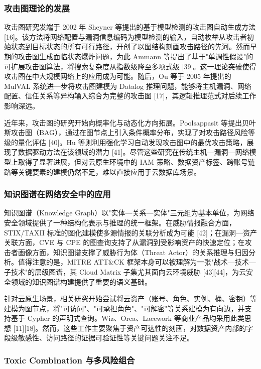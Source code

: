 \documentclass[a4paper,12pt]{ctexart}
\begin{document}
\subsubsection{攻击图理论的发展}

攻击图研究发端于 2002 年 Sheyner 等提出的基于模型检测的攻击图自动生成方法 [16]。该方法将网络配置与漏洞信息编码为模型检测的输入，自动枚举从攻击者初始状态到目标状态的所有可行路径，开创了以图结构刻画攻击路径的先河。然而早期的攻击图生成面临状态爆炸问题，为此 Ammann 等提出了基于"单调性假设"的可扩展攻击图算法，将搜索复杂度从指数级降至多项式级 [39]。这一理论突破使得攻击图在中大规模网络上的应用成为可能。随后，Ou 等于 2005 年提出的 MulVAL 系统进一步将攻击图建模为 Datalog 推理问题，能够将主机漏洞、网络配置、信任关系等异构输入综合为完整的攻击图 [17]，其逻辑推理范式对后续工作影响深远。

近年来，攻击图的研究开始向概率化与动态化方向拓展。Poolsappasit 等提出贝叶斯攻击图（BAG），通过在图节点上引入条件概率分布，实现了对攻击路径风险等级的量化评估 [40]。Hu 等则利用强化学习自动发现攻击图中的最优攻击策略，展现了数据驱动方法在该领域的潜力 [41]。尽管这些研究在传统主机—漏洞—网络模型上取得了显著进展，但对云原生环境中的 IAM 策略、数据资产标签、跨账号链路等关键要素的建模仍然不足，难以直接应用于云数据库场景。

\subsubsection{知识图谱在网络安全中的应用}

知识图谱（Knowledge Graph）以"实体—关系—实体"三元组为基本单位，为网络安全领域提供了一种结构化表示与推理的统一框架。在威胁情报融合方面，STIX/TAXII 标准的图化建模使多源情报的关联分析成为可能 [42]；在漏洞—资产关联方面，CVE 与 CPE 的图查询支持了从漏洞到受影响资产的快速定位；在攻击者画像方面，知识图谱支撑了威胁行为体（Threat Actor）的关系推理与归因分析。值得注意的是，MITRE ATT\&CK 框架本身可以被理解为一张"战术—技术—子技术"的层级图谱，其 Cloud Matrix 子集尤其面向云环境威胁 [43][44]，为云安全领域的知识图谱构建提供了重要的语义基础。

针对云原生场景，相关研究开始尝试将云资产（账号、角色、实例、桶、密钥）等建模为图节点，将"可访问"、"可承担角色"、"可解密"等关系建模为有向边，并支持基于 Cypher 的声明式查询。Wiz、Orca、Lacework 等商业产品均采用此类思想 [11][18]。然而，这些工作主要聚焦于资产可达性的刻画，对数据资产内部的字段级敏感性、访问路径的证据可验证性等关键问题关注不足。

\subsubsection{Toxic Combination 与多风险组合}
\end{document}
